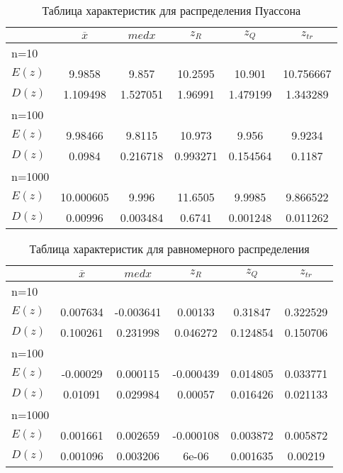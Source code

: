 \documentclass[12pt,a4paper]{article}
\begin{document}
\begin{table}[H]
    \centering
    \begin{tabular}{|l||c|c|c|c|c|}
        \hline
        & $\overline{x}$ & $med x$ & $z_R$ & $z_Q$ & $z_{tr}$\\\hline\hline
        n=10 & & & & &\\\hline
        $E(z)$ & 9.9858 & 9.857 & 10.2595 & 10.901 & 10.756667\\\hline
        $D(z)$ & 1.109498 & 1.527051 & 1.96991 & 1.479199 & 1.343289\\\hline
        n=100 & & & & &\\\hline
        $E(z)$ & 9.98466 & 9.8115 & 10.973 & 9.956 & 9.9234\\\hline
        $D(z)$ & 0.0984 & 0.216718 & 0.993271 & 0.154564 & 0.1187\\\hline
        n=1000 & & & & &\\\hline
        $E(z)$ & 10.000605 & 9.996 & 11.6505 & 9.9985 & 9.866522\\\hline
        $D(z)$ & 0.00996 & 0.003484 & 0.6741 & 0.001248 & 0.011262\\\hline
    \end{tabular}
    \caption{Таблица характеристик для распределения Пуассона}
    \label{tab:poisson}
\end{table}

\begin{table}[H]
    \centering
    \begin{tabular}{|l||c|c|c|c|c|}
        \hline
        & $\overline{x}$ & $med x$ & $z_R$ & $z_Q$ & $z_{tr}$\\\hline\hline
        n=10 & & & & &\\\hline
        $E(z)$ & 0.007634 & -0.003641 & 0.00133 & 0.31847 & 0.322529\\\hline
        $D(z)$ & 0.100261 & 0.231998 & 0.046272 & 0.124854 & 0.150706\\\hline
        n=100 & & & & &\\\hline
        $E(z)$ & -0.00029 & 0.000115 & -0.000439 & 0.014805 & 0.033771\\\hline
        $D(z)$ & 0.01091 & 0.029984 & 0.00057 & 0.016426 & 0.021133\\\hline
        n=1000 & & & & &\\\hline
        $E(z)$ & 0.001661 & 0.002659 & -0.000108 & 0.003872 & 0.005872\\\hline
        $D(z)$ & 0.001096 & 0.003206 & 6e-06 & 0.001635 & 0.00219\\\hline
    \end{tabular}
    \caption{Таблица характеристик для равномерного распределения}
    \label{tab:uniform}
\end{table}
\end{document}
